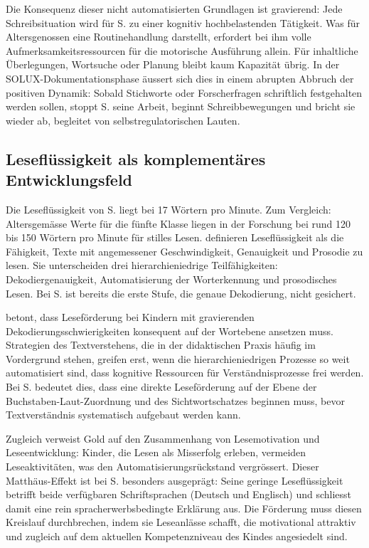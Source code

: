 \documentclass[ngerman, a4paper]{article}
\begin{document}
Die Konsequenz dieser nicht automatisierten Grundlagen ist gravierend: Jede
Schreibsituation wird für S. zu einer kognitiv hochbelastenden Tätigkeit. Was für
Altersgenossen eine Routinehandlung darstellt, erfordert bei ihm volle
Aufmerksamkeitsressourcen für die motorische Ausführung allein. Für inhaltliche
Überlegungen, Wortsuche oder Planung bleibt kaum Kapazität übrig. In der
SOLUX-Dokumentationsphase äussert sich dies in einem abrupten Abbruch der positiven
Dynamik: Sobald Stichworte oder Forscherfragen schriftlich festgehalten werden sollen,
stoppt S. seine Arbeit, beginnt Schreibbewegungen und bricht sie wieder ab, begleitet
von selbstregulatorischen Lauten.

\subsection{Leseflüssigkeit als komplementäres Entwicklungsfeld}

Die Leseflüssigkeit von S. liegt bei 17 Wörtern pro Minute. Zum Vergleich: Altersgemässe
Werte für die fünfte Klasse liegen in der Forschung bei rund 120 bis 150 Wörtern pro
Minute für stilles Lesen. \textcite{rosebrock2010grundlagen} definieren Leseflüssigkeit als die Fähigkeit,
Texte mit angemessener Geschwindigkeit, Genauigkeit und Prosodie zu lesen. Sie
unterscheiden drei hierarchieniedrige Teilfähigkeiten: Dekodiergenauigkeit,
Automatisierung der Worterkennung und prosodisches Lesen. Bei S. ist bereits die
erste Stufe, die genaue Dekodierung, nicht gesichert.

\textcite{gold2018lesenkannmanlernen} betont, dass Leseförderung bei Kindern mit gravierenden
Dekodierungsschwierigkeiten konsequent auf der Wortebene ansetzen muss. Strategien
des Textverstehens, die in der didaktischen Praxis häufig im Vordergrund stehen,
greifen erst, wenn die hierarchieniedrigen Prozesse so weit automatisiert sind, dass
kognitive Ressourcen für Verständnisprozesse frei werden. Bei S. bedeutet dies, dass
eine direkte Leseförderung auf der Ebene der Buchstaben-Laut-Zuordnung und des
Sichtwortschatzes beginnen muss, bevor Textverständnis systematisch aufgebaut werden
kann.

Zugleich verweist Gold auf den Zusammenhang von Lesemotivation und Leseentwicklung:
Kinder, die Lesen als Misserfolg erleben, vermeiden Leseaktivitäten, was den
Automatisierungsrückstand vergrössert. Dieser Matthäus-Effekt ist bei S.
besonders ausgeprägt: Seine geringe Leseflüssigkeit betrifft beide verfügbaren
Schriftsprachen (Deutsch und Englisch) und schliesst damit eine rein
spracherwerbsbedingte Erklärung aus. Die Förderung muss diesen Kreislauf
durchbrechen, indem sie Leseanlässe schafft, die motivational attraktiv und zugleich
auf dem aktuellen Kompetenzniveau des Kindes angesiedelt sind.
\end{document}
